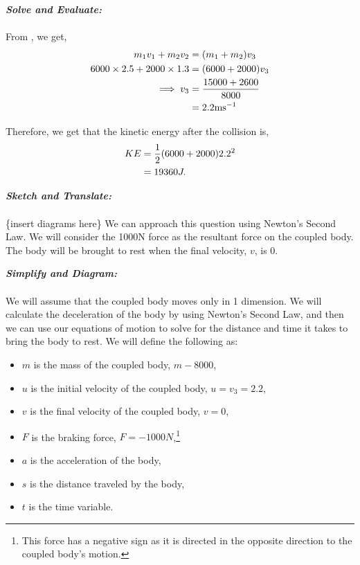 \begin{subquestions}
\begin{subsubquestions}
\textbf{\textit{Solve and Evaluate:}} \\ \\
From , we get,
\begin{align}
	m_1v_1 + m_2v_2 & = (m_1+m_2)v_3 \nonumber \\
	6000\times2.5 + 2000\times1.3 & = (6000+2000)v_3 \nonumber \\
	\implies v_3 & = \frac{15000+2600}{8000} \nonumber \\
	& = 2.2\text{ms}^{-1}
\end{align}

Therefore, we get that the kinetic energy after the collision is,
\begin{align}
	KE & = \frac{1}{2}(6000+2000)2.2^2 \nonumber \\
	   & = 19360J.
\end{align} 


\subsubquestion

\textbf{\textit{Sketch and Translate:}} \\ \\
\{insert diagrams here\}
We can approach this question using Newton's Second Law. We will consider the 1000N force as the resultant force on the coupled body. The body will be brought to rest when the final velocity, $v$, is 0.




\textbf{\textit{Simplify and Diagram:}} \\ \\
We will assume that the coupled body moves only in 1 dimension. We will calculate the deceleration of the body by using Newton's Second Law, and then we can use our equations of motion to solve for the distance and time it takes to bring the body to rest. We will define the following as:
\begin{itemize}
	\item $m$ is the mass of the coupled body, $m-8000$,
	\item $u$ is the initial velocity of the coupled body, $u=v_3=2.2$,
	\item $v$ is the final velocity of the coupled body, $v=0$,
	\item $F$ is the braking force, $F=-1000N$,\footnote{This force has a negative sign as it is directed in the opposite direction to the coupled body's motion.}
	\item $a$ is the acceleration of the body,
	\item $s$ is the distance traveled by the body,
	\item $t$ is the time variable.
\end{itemize}




\end{subsubquestions}
\end{subquestions}
